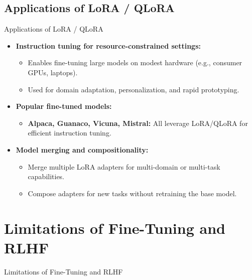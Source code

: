 \subsection{Applications of LoRA / QLoRA}
\begin{frame}{Applications of LoRA / QLoRA}
    \begin{itemize}
        \item \textbf{Instruction tuning for resource-constrained settings:}
        \begin{itemize}
            \item Enables fine-tuning large models on modest hardware (e.g., consumer GPUs, laptops).
            \item Used for domain adaptation, personalization, and rapid prototyping.
        \end{itemize}
        \item \textbf{Popular fine-tuned models:}
        \begin{itemize}
            \item \textbf{Alpaca, Guanaco, Vicuna, Mistral:} All leverage LoRA/QLoRA for efficient instruction tuning.
        \end{itemize}
        \item \textbf{Model merging and compositionality:}
        \begin{itemize}
            \item Merge multiple LoRA adapters for multi-domain or multi-task capabilities.
            \item Compose adapters for new tasks without retraining the base model.
        \end{itemize}
    \end{itemize}
\end{frame}


\section{Limitations of Fine-Tuning and RLHF}
\begin{frame}{}
    \LARGE Limitations of Fine-Tuning and RLHF
\end{frame}


